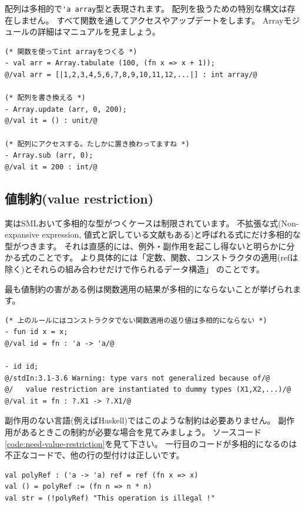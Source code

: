 \documentclass[11pt,a4paper]{article}
\begin{document}
配列は多相的で\lstinline{'a array}型と表現されます。
配列を扱うための特別な構文は存在しません。
すべて関数を通してアクセスやアップデートをします。
Arrayモジュールの詳細はマニュアルを見ましょう\cite{sml-libs}。

\begin{lstlisting}[caption=配列の扱い,label=code:array]
(* 関数を使ってint arrayをつくる *)
- val arr = Array.tabulate (100, (fn x => x + 1));
@/val arr = [|1,2,3,4,5,6,7,8,9,10,11,12,...|] : int array/@

(* 配列を書き換える *)
- Array.update (arr, 0, 200);
@/val it = () : unit/@

(* 配列にアクセスする。たしかに置き換わってますね *)
- Array.sub (arr, 0);
@/val it = 200 : int/@
\end{lstlisting}

\subsection{値制約(value restriction)}

実はSMLおいて多相的な型がつくケースは制限されています。
不拡張な式(Non-expansive expression, 値式と訳している文献もある)と呼ばれる式にだけ多相的な型がつきます。
それは直感的には、例外・副作用を起こし得ないと明らかに分かる式のことです。
より具体的には「定数、関数、コンストラクタの適用(refは除く)とそれらの組み合わせだけで作られるデータ構造」
のことです。

最も値制約の害がある例は関数適用の結果が多相的にならないことが挙げられます。

\begin{lstlisting}[caption=値制約,label=code:value-description]
(* 上のルールにはコンストラクタでない関数適用の返り値は多相的にならない *)
- fun id x = x;
@/val id = fn : 'a -> 'a/@

- id id;
@/stdIn:3.1-3.6 Warning: type vars not generalized because of/@
@/   value restriction are instantiated to dummy types (X1,X2,...)/@
@/val it = fn : ?.X1 -> ?.X1/@
\end{lstlisting}

副作用のない言語(例えばHaskell)ではこのような制約は必要ありません。
副作用があるときこの制約が必要な場合を見てみましょう。
ソースコード\ref{code:need-value-restriction}を見て下さい。
一行目のコードが多相的になるのは不正なコードで、他の行の型付けは正しいです。

\begin{lstlisting}[caption=値制約が必要なケース(不正なコード、動かない),label=code:need-value-restriction]
val polyRef : ('a -> 'a) ref = ref (fn x => x)
val () = polyRef := (fn n => n * n)
val str = (!polyRef) "This operation is illegal !"
\end{lstlisting}
\end{document}
